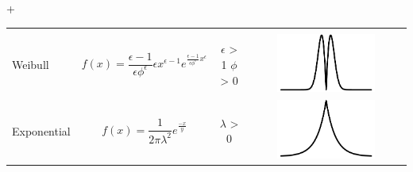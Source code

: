 +\documentclass[12pt]{article}
\begin{document}
\begin{longtable}[]{@{}lrcc@{}}
\begin{minipage}[t]{0.18\columnwidth}
\end{minipage}\tabularnewline
\begin{minipage}[t]{0.17\columnwidth}\raggedright\strut
Weibull\strut
\end{minipage} & \begin{minipage}[t]{0.15\columnwidth}\raggedleft\strut
\[ f(x) = \frac{\epsilon - 1}{\epsilon\phi^\epsilon} \epsilon x^{\epsilon - 1} e^{\frac{\epsilon - 1}{\epsilon\phi^\epsilon}x^\epsilon} \]\strut
\end{minipage} & \begin{minipage}[t]{0.16\columnwidth}\centering\strut
\(\epsilon\) \textgreater{} 1 \(\phi\) \textgreater{} 0\strut
\end{minipage} & \begin{minipage}[t]{0.18\columnwidth}\centering\strut
\includegraphics[width=0.65000\textwidth]{figure/weibull.pdf}\strut
\end{minipage}\tabularnewline
\begin{minipage}[t]{0.17\columnwidth}\raggedright\strut
Exponential\strut
\end{minipage} & \begin{minipage}[t]{0.15\columnwidth}\raggedleft\strut
\[ f(x) = \frac{1}{2\pi\lambda^2} e^{\frac{-x}{y}} \]\strut
\end{minipage} & \begin{minipage}[t]{0.16\columnwidth}\centering\strut
\(\lambda\) \textgreater{} 0\strut
\end{minipage} & \begin{minipage}[t]{0.18\columnwidth}\centering\strut
\includegraphics[width=0.65000\textwidth]{figure/exponential.pdf}\strut

\end{minipage}
\end{longtable}
\end{document}
